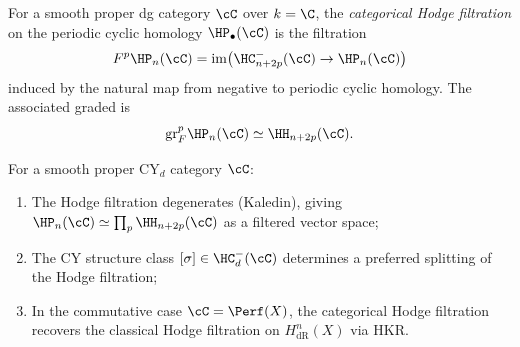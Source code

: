 \begin{definition}
\label{def:categorical-hodge-filtration}
For a smooth proper dg category $\cC$ over $k = \C$, the
\emph{categorical Hodge filtration} on the periodic cyclic
homology $\HP_\bullet(\cC)$ is the filtration
\[
 F^p \HP_n(\cC)
 = \mathrm{im}\bigl(\HC^-_{n+2p}(\cC) \to \HP_n(\cC)\bigr)
\]
induced by the natural map from negative to periodic cyclic
homology. The associated graded is
\[
 \mathrm{gr}^p_F \HP_n(\cC)
 \simeq \HH_{n+2p}(\cC).
\]
\end{definition}

\begin{proposition}
\label{prop:nc-hodge-dr}
For a smooth proper CY$_d$ category $\cC$:
\begin{enumerate}[label=(\roman*)]
 \item The Hodge filtration degenerates (Kaledin), giving
 $\HP_n(\cC) \simeq \prod_{p} \HH_{n+2p}(\cC)$ as a filtered
 vector space;
 \item The CY structure class $[\sigma] \in \HC^-_d(\cC)$
 determines a preferred splitting of the Hodge filtration;
 \item In the commutative case $\cC = \Perf(X)$, the
 categorical Hodge filtration recovers the classical Hodge
 filtration on $H^n_{\mathrm{dR}}(X)$ via HKR.
\end{enumerate}
\end{proposition}

